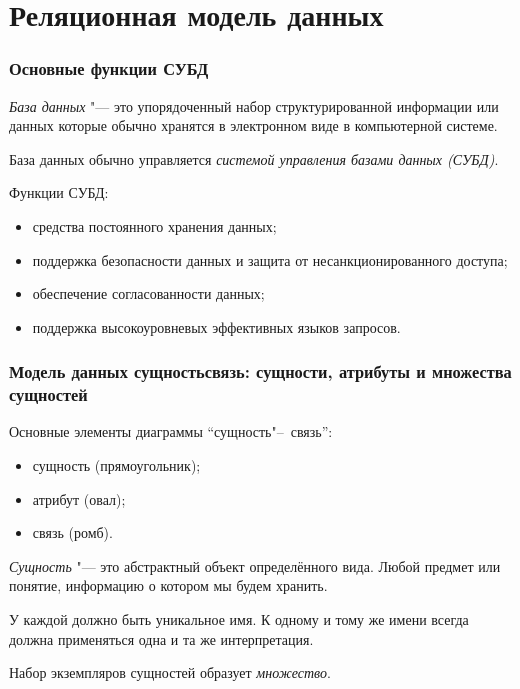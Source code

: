 \part{Реляционная модель данных}

\section{Основные функции СУБД}

\begin{definition}
	\emph{База данных} "--- это упорядоченный набор структурированной информации или данных которые обычно хранятся в электронном виде в компьютерной системе.
\end{definition}

База данных обычно управляется \emph{системой управления базами данных (СУБД)}.

Функции СУБД:
\begin{itemize}
	\item средства постоянного хранения данных;
	\item поддержка безопасности данных и защита от несанкционированного доступа;
	\item обеспечение согласованности данных;
	\item поддержка высокоуровневых эффективных языков запросов.
\end{itemize}

\section{Модель данных сущностьсвязь: сущности, атрибуты и множества сущностей}

Основные элементы диаграммы ``сущность"--~связь'':
\begin{itemize}
	\item сущность (прямоугольник);
	\item атрибут (овал);
	\item связь (ромб).
\end{itemize}

\begin{definition}
	\emph{Сущность} "--- это абстрактный объект определённого вида.
	Любой предмет или понятие, информацию о котором мы будем хранить.
\end{definition}

У каждой должно быть уникальное имя.
К одному и тому же имени всегда должна применяться одна и та же интерпретация.

\begin{definition}
	Набор экземпляров сущностей образует \emph{множество}.
\end{definition}

